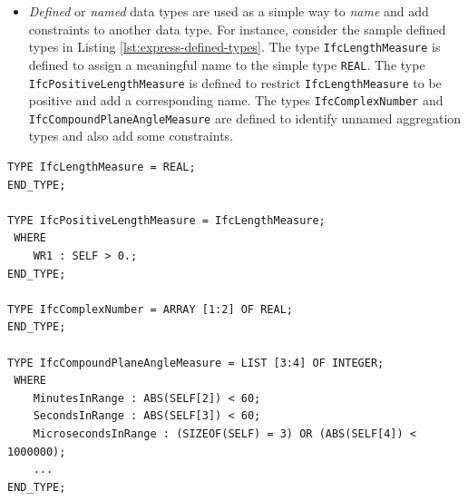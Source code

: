 \begin{itemize}
\item
\emph{Defined} or \emph{named} data types are used as a simple way to \emph{name} and add constraints to another data type.
For instance, consider the sample defined types in Listing \ref{lst:express-defined-types}.
The type \texttt{Ifc\-Length\-Measure} is defined to assign a meaningful name to the simple type \texttt{REAL}.
The type \texttt{Ifc\-Positive\-Length\-Measure} is defined to restrict \texttt{Ifc\-Length\-Measure} to be positive and add a corresponding name.
The types \texttt{Ifc\-Complex\-Number} and \texttt{Ifc\-Compound\-Plane\-Angle\-Measure} are defined to identify unnamed aggregation types and also add some constraints.








\end{itemize}


\begin{lstlisting}[caption={Examples of defined data types},label=lst:express-defined-types]
TYPE IfcLengthMeasure = REAL;
END_TYPE;

TYPE IfcPositiveLengthMeasure = IfcLengthMeasure;
 WHERE
    WR1 : SELF > 0.;
END_TYPE;

TYPE IfcComplexNumber = ARRAY [1:2] OF REAL;
END_TYPE;

TYPE IfcCompoundPlaneAngleMeasure = LIST [3:4] OF INTEGER;
 WHERE
    MinutesInRange : ABS(SELF[2]) < 60;
    SecondsInRange : ABS(SELF[3]) < 60;
    MicrosecondsInRange : (SIZEOF(SELF) = 3) OR (ABS(SELF[4]) < 1000000);
    ...
END_TYPE;


\end{lstlisting}



